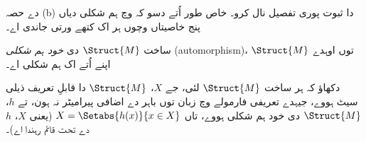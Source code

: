 \documentclass[../../../include/open-logic-section]{subfiles}
\begin{document}
\begin{prob}
 دے حصہ (b) دا ثبوت پوری تفصیل نال
کرو۔ خاص طور اُتے دسو کہ 
وچ ہم شکلی دیاں پنج خاصیتاں وچوں ہر اک کتھے ورتی جاندی اے۔
\end{prob}

\begin{defn}
ساخت $\Struct{M}$ دی \emph{خود ہم شکلی} (automorphism)،
$\Struct{M}$ توں اوہدے اپنے اُتے اک ہم شکلی اے۔
\end{defn}

\begin{prob}
دکھاؤ کہ ہر ساخت $\Struct{M}$ لئی، جے $X$، $\Struct{M}$ دا
قابلِ تعریف ذیلی سیٹ ہووے، جیہدے تعریفی فارمولے وچ زبان توں باہر دے
اضافی پیرامیٹر نہ ہون، تے $h$، $\Struct{M}$ دی خود ہم شکلی ہووے،
تاں $X
= \Setabs{h(x)}{x \in X}$ (یعنی $X$، $h$ دے تحت قائم رہندا اے)۔
\end{prob}
\end{document}
